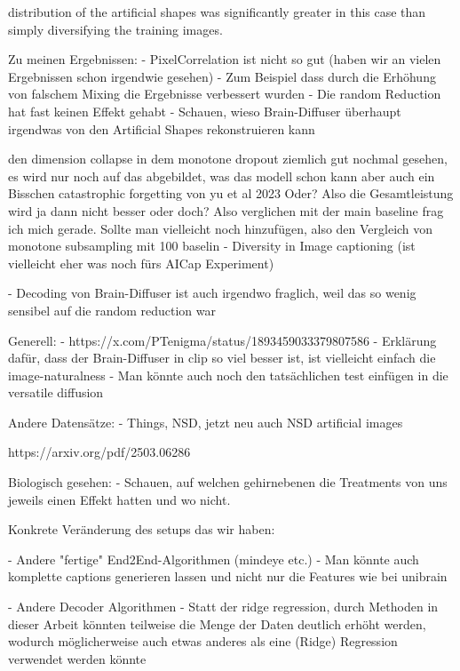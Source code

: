 distribution of the artificial shapes was significantly greater in this case than simply diversifying the training images.


Zu meinen Ergebnissen:
- PixelCorrelation ist nicht so gut (haben wir an vielen Ergebnissen schon irgendwie gesehen)
    - Zum Beispiel dass durch die Erhöhung von falschem Mixing die Ergebnisse verbessert wurden
    - Die random Reduction hat fast keinen Effekt gehabt
    - Schauen, wieso Brain-Diffuser überhaupt irgendwas von den Artificial Shapes rekonstruieren kann


den dimension collapse in dem monotone dropout ziemlich gut nochmal gesehen, es wird nur noch auf das abgebildet, was das modell schon kann
aber auch ein Bisschen catastrophic forgetting von yu et al 2023
Oder?
Also die Gesamtleistung wird ja dann nicht besser oder doch?
Also verglichen mit der main baseline frag ich mich gerade.
Sollte man vielleicht noch hinzufügen, also den Vergleich von monotone subsampling mit 100 baselin
\cite{wangDiversityImageCaptioning2022}
- Diversity in Image captioning (ist vielleicht eher was noch fürs AICap Experiment)

- Decoding von Brain-Diffuser ist auch irgendwo fraglich, weil das so wenig sensibel auf die random reduction war

Generell:
- https://x.com/PTenigma/status/1893459033379807586
- Erklärung dafür, dass der Brain-Diffuser in clip so viel besser ist, ist vielleicht einfach die image-naturalness
- Man könnte auch noch den tatsächlichen test einfügen in die versatile diffusion

Andere Datensätze:
- Things, NSD, jetzt neu auch NSD artificial images 

https://arxiv.org/pdf/2503.06286

Biologisch gesehen:
- Schauen, auf welchen gehirnebenen die Treatments von uns jeweils einen Effekt hatten und wo nicht.

Konkrete Veränderung des setups das wir haben:

- Andere "fertige" End2End-Algorithmen (mindeye etc.)
    - Man könnte auch komplette captions generieren lassen und nicht nur die Features wie bei unibrain \cite{maiUniBrainUnifyImage2023}

- Andere Decoder Algorithmen 
    - Statt der ridge regression, durch Methoden in dieser Arbeit könnten teilweise die Menge der Daten deutlich erhöht werden, wodurch möglicherweise auch etwas anderes als eine (Ridge) Regression verwendet werden könnte

